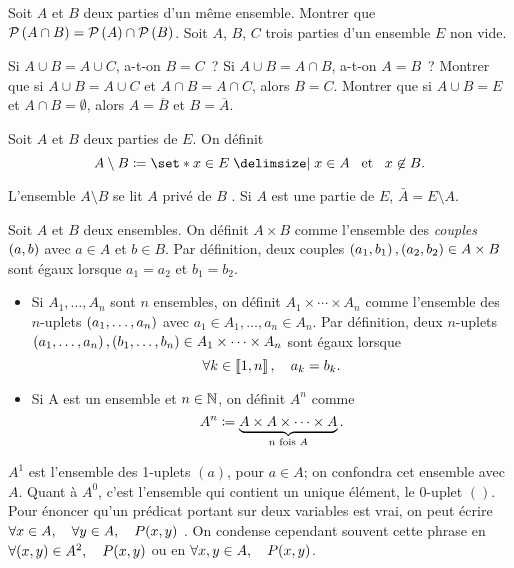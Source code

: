 \documentclass{magnolia}
\begin{document}
\begin{exos}
\exo Soit $A$ et $B$ deux parties d'un même ensemble. Montrer que
  $\mathcal{P}\left(A\cap B\right)=\mathcal{P}\left(A\right)\cap\mathcal{P}\left(B\right)$.
\exo Soit $A$, $B$, $C$ trois parties d'un ensemble $E$ non vide.
  \begin{questions}
  \question Si $A\cup B=A\cup C$, a-t-on $B=C$~?
  \question Si $A\cup B=A\cap B$, a-t-on $A=B$~?
  \question Montrer que si $A\cup B=A\cup C$ et $A\cap B=A\cap C$, alors $B=C$.
  \question Montrer que si $A\cup B=E$ et $A\cap B=\emptyset$, alors $A=\overline{B}$ et
  $B=\overline{A}$.
  \end{questions}
\end{exos}

\begin{definition}[utile=-3]
Soit $A$ et $B$ deux parties de $E$. On définit
\[A\setminus B\defeq\enstq{x\in E}{x\in A \et x\not\in B}.\]
\end{definition}

\begin{remarques}
\remarque L'ensemble $A\setminus B$ se lit \og $A$ privé de $B$ \fg.
\remarque Si $A$ est une partie de $E$, $\bar{A}=E\setminus A$.
\end{remarques}

\begin{definition}
Soit $A$ et $B$ deux ensembles. On définit $A\times B$ comme l'ensemble
des \emph{couples} $\left(a,b\right)$ avec $a\in A$ et $b\in B$. Par définition, deux couples
$\left(a_1,b_1\right), \left(a_2,b_2\right)\in A\times B$ sont égaux lorsque $a_1=a_2$ et $b_1=b_2$.
\end{definition}

\begin{definition}[utile=-3]
\begin{itemize}
\item Si $A_1,\ldots,A_n$ sont $n$ ensembles, on définit
  $A_1\times\cdots\times A_n$ comme l'ensemble des $n$-uplets
  $\left(a_1,\ldots,a_n\right)$ avec $a_1\in A_1,\ldots,a_n\in A_n$. Par définition, deux $n$-uplets
  $\left(a_1,\ldots,a_n\right), \left(b_1,\ldots,b_n\right)\in A_1\times\cdots\times A_n$ sont égaux lorsque
  \[\forall k\in\left\llbracket 1,n\right\rrbracket ,\quad a_k=b_k.\]
\item Si A est un ensemble et $n\in\mathbb{N}$, on définit $A^n$ comme
  \[A^n\coloneqq\underbrace{A\times A\times\cdots\times A}_{\text{$n$ fois $A$}}.\]
\end{itemize}
\end{definition}

\begin{remarques}
\remarque $A^1$ est l'ensemble des 1-uplets $(a)$, pour $a\in A$; on confondra cet
  ensemble avec $A$. Quant à $A^0$, c'est l'ensemble qui contient un unique élément,
  le $0$-uplet $()$.
\remarque Pour énoncer qu'un prédicat portant sur deux variables est vrai, on peut écrire
  \og $\forall x\in A,\quad \forall y\in A,\quad P(x,y)$ \fg.
  On condense cependant souvent cette phrase en \og $\forall (x,y)\in A^2,\quad P(x,y)$ \fg ou
  en \og $\forall x,y\in A,\quad P(x,y)$\fg.
\end{remarques}
\end{document}
